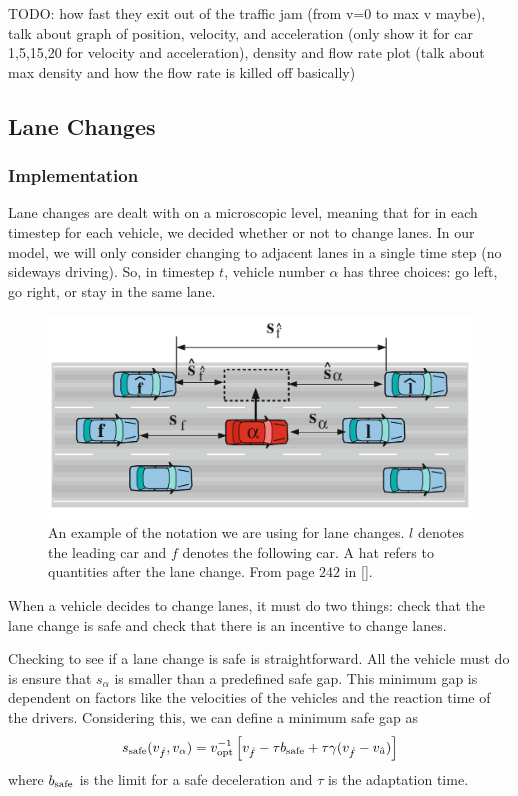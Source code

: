 \documentclass[12pt]{article}
\begin{document}
      
    TODO: how fast they exit out of the traffic jam (from v=0 to max v maybe), talk about graph of position, velocity, and acceleration (only show it for car 1,5,15,20 for velocity and acceleration), density and flow rate plot (talk about max density and how the flow rate is killed off basically) 
    \subsection{Lane Changes}
    \subsubsection{Implementation}

   Lane changes are dealt with on a microscopic level, meaning that for in each timestep for each vehicle, we decided whether or not to change lanes.  In our model, we will only consider changing to adjacent lanes in a single time step (no sideways driving). So, in timestep $t$, vehicle number $\alpha$ has three choices: go left, go right, or stay in the same lane.

      \begin{figure}[H]
        \begin{center}
          \includegraphics{lane_change_diagram.PNG}
        \end{center}
        \caption{An example of the notation we are using for lane changes. $l$ denotes the leading car and $f$ denotes the following car. A hat refers to quantities after the lane change. From page $242$ in [\cite{traffic}].}
      \end{figure}

      When a vehicle decides to change lanes, it must do two things: check that the lane change is safe and check that there is an incentive to change lanes.

      Checking to see if a lane change is safe is straightforward. All the vehicle must do is ensure that $s_{\alpha}$ is smaller than a predefined safe gap. This minimum gap is dependent on factors like the velocities of the vehicles and the reaction time of the drivers. 
      Considering this, we can define a minimum safe gap as 
      \begin{equation}
        s_{\rm safe} (v_{\hat f}, v_{\alpha}) = v_{\rm opt}^{-1} \left[v_{\hat f} -\tau b_{\rm safe} + \tau \gamma (v_{\hat f} - v_{\hat a}) \right]
      \end{equation}
      where $b_{\rm safe}$ is the limit for a safe deceleration and $\tau$ is the adaptation time. 
\end{document}
